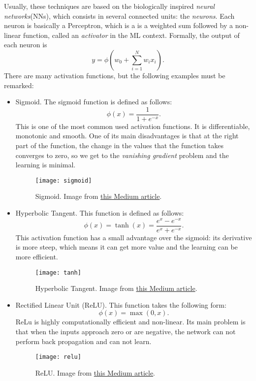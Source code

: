 Usually, these techniques are based on the biologically inspired \emph{neural networks}(NNs), which consists in several connected units: the \emph{neurons}. Each neuron is basically a Perceptron, which is a is a weighted sum followed by a non-linear function, called an \emph{activator} in the ML context. Formally, the output of each neuron is 
\[
y = \phi\left(w_0 +\sum_{i = 1}^N w_i x_i \right) .   
\]
There are many activation functions, but the following examples must be remarked:
\begin{itemize}
\item Sigmoid. The sigmoid function is defined as follows:
\[
\phi(x) = \frac{1}{1+ e^{-x}}.
\]
This is one of the most common used activation functions. It is differentiable, monotonic and smooth. One of its main disadvantages is that at the right part of the function, the change in the values that the function takes converges to zero, so we get to the \emph{vanishing gradient} problem and the learning is minimal.

\begin{figure}[H]
    \centering
    \texttt{[image: sigmoid]}
    \caption{Sigmoid. Image from \href{https://xzz201920.medium.com/activation-functions-linear-non-linear-in-deep-learning-relu-sigmoid-softmax-swish-leaky-relu-a6333be712ea}{this Medium article}. } \label{fig:sigmoid}
\end{figure}

\item Hyperbolic Tangent. This function is defined as follows:
\[
\phi(x) = \operatorname{tanh}(x) =  \frac{e^x - e^{-x}}{e^x + e^{-x}}.    
\]
This activation function has a small advantage over the sigmoid: its derivative is more steep, which means it can get more value and the learning can be more efficient.

\begin{figure}[H]
    \centering
    \texttt{[image: tanh]}
    \caption{Hyperbolic Tangent. Image from \href{https://xzz201920.medium.com/activation-functions-linear-non-linear-in-deep-learning-relu-sigmoid-softmax-swish-leaky-relu-a6333be712ea}{this Medium article}. } \label{fig:tanh}
\end{figure}

\item Rectified Linear Unit (ReLU). This function takes the following form:
\[
\phi(x) = \max\left(0,x\right).    
\]
ReLu is highly computationally efficient and non-linear. Its main problem is that when the inputs approach zero or are negative, the network can not perform back propagation and can not learn.

\begin{figure}[H]
    \centering
    \texttt{[image: relu]}
    \caption{ReLU. Image from \href{https://xzz201920.medium.com/activation-functions-linear-non-linear-in-deep-learning-relu-sigmoid-softmax-swish-leaky-relu-a6333be712ea}{this Medium article}. } \label{fig:relu}
\end{figure}
\end{itemize}




